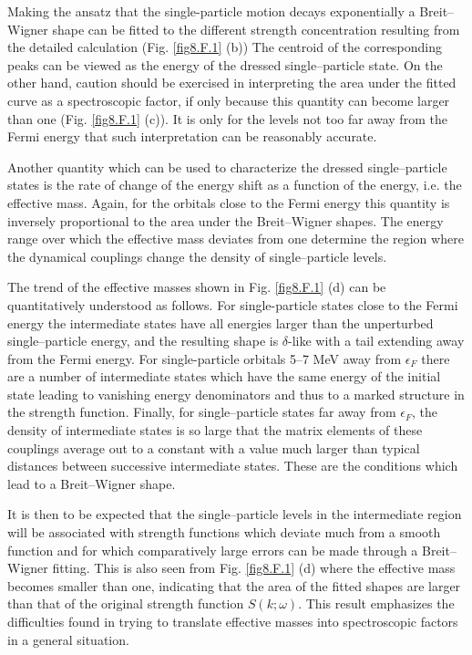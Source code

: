 Making the ansatz that the single-particle motion decays exponentially a Breit--Wigner shape can be fitted to the different strength concentration resulting from the detailed calculation (Fig. \ref{fig8.F.1} (b)) The centroid of the corresponding peaks can be viewed as the energy of the dressed single--particle state. On the other hand, caution should be exercised in interpreting the area under the fitted curve as a spectroscopic factor, if only because this quantity can become larger than one (Fig. \ref{fig8.F.1} (c)). It is only for the levels not too far away from the Fermi energy that such interpretation can   be reasonably accurate.


Another quantity which can be used to characterize the dressed single--particle states is the rate of change of the energy shift as a function of the energy, i.e. the effective mass. Again, for the orbitals close to the Fermi energy this quantity is inversely proportional to the area under the Breit--Wigner shapes. The energy range over which the effective mass deviates from one determine the region where the dynamical couplings change the density of single--particle levels.



The trend of the effective masses shown in Fig. \ref{fig8.F.1} (d) can be quantitatively understood as follows. For single-particle states close to the Fermi energy the intermediate states have all energies larger than the unperturbed single--particle energy, and the resulting shape is $\delta$-like with a tail extending away from the Fermi energy. For single-particle orbitals 5--7 MeV away from $\epsilon_F$ there are a number of intermediate states which have the same energy of the initial state leading to vanishing energy denominators and thus to a marked structure in the strength function. Finally, for single--particle states far away from $\epsilon_F$, the density of intermediate states is so large that the matrix elements of these couplings average out to a constant with a value much larger than typical distances between successive intermediate states. These are the conditions which lead to a Breit--Wigner shape.  


It is then to be expected that the single--particle levels in the intermediate region will be associated with strength functions which deviate much from a smooth function and for which comparatively large errors can be made through a Breit--Wigner fitting. This is also seen from Fig. \ref{fig8.F.1} (d) where the effective mass becomes smaller than one, indicating that the area of the fitted shapes are larger than that of the original strength function $S(k;\omega)$. This result emphasizes the difficulties found in trying to translate effective masses into spectroscopic factors in a general situation.


